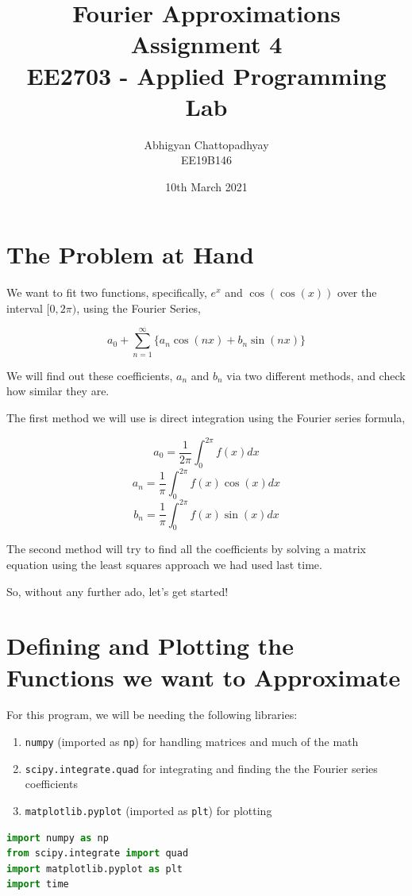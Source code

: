 \documentclass[12pt]{article}
\title{\vspace{-1cm}Fourier Approximations\\
\large Assignment 4\\
\large EE2703 - Applied Programming Lab}
\author{Abhigyan Chattopadhyay \\
EE19B146}
\date{10th March 2021}
\begin{document}
\maketitle
\tableofcontents
\pagebreak
\section{The Problem at Hand}

We want to fit two functions, specifically, $e^x$ and $\cos(\cos(x))$ over the interval $[0,2\pi)$, using the Fourier Series,

$$a_0 + \sum_{n=1}^{\infty}\{a_n\cos(nx)+b_n\sin(nx)\}$$

We will find out these coefficients, $a_n$ and $b_n$ via two different methods, and check how similar they are.

The first method we will use is direct integration using the Fourier series formula,

$$a_0 = \frac{1}{2\pi}\int_{0}^{2\pi}f(x)dx$$
$$a_n = \frac{1}{\pi}\int_{0}^{2\pi}f(x)\cos(x)dx$$
$$b_n = \frac{1}{\pi}\int_{0}^{2\pi}f(x)\sin(x)dx$$

The second method will try to find all the coefficients by solving a matrix equation using the least squares approach we had used last time.

So, without any further ado, let's get started!

\pagebreak
\section{Defining and Plotting the Functions we want to Approximate}

For this program, we will be needing the following libraries:

\begin{enumerate}
    \item \texttt{numpy} (imported as \texttt{np}) for handling matrices and much of the math
    \item \texttt{scipy.integrate.quad} for integrating and finding the the Fourier series coefficients
    \item \texttt{matplotlib.pyplot} (imported as \texttt{plt}) for plotting
\end{enumerate}

\begin{lstlisting}[language=Python]
import numpy as np
from scipy.integrate import quad
import matplotlib.pyplot as plt
import time
\end{lstlisting}
\end{document}
